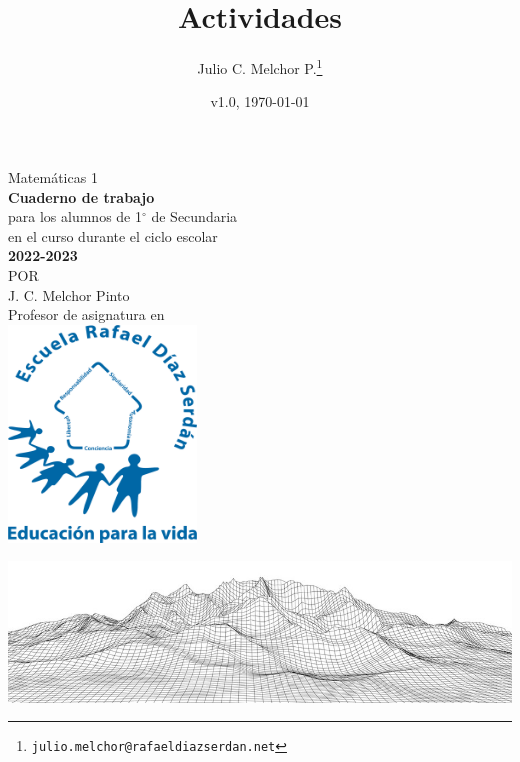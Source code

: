 \documentclass[]{book}
\title{Actividades}
\author{Julio C. Melchor P.\thanks{{\tt julio.melchor@rafaeldiazserdan.net}}}
\date{v1.0, \today}
\begin{document}
\pagestyle{empty}
\begin{center}
    {\Huge Matem\'aticas 1}\\
    \vspace{1cm}
    \normalsize
    \textbf{\large Cuaderno de trabajo}\\
    para los alumnos de 1$^\circ$ de  Secundaria\\
    en el curso durante el ciclo escolar\\
    \textbf{2022-2023}\\
    \vspace{2.2cm}
    \small POR\\
    \Large J. C. Melchor Pinto\\[0.5em]
    \normalsize Profesor de asignatura en\\
    \vspace{1cm}
    \includegraphics[width=5cm]{./Unidad 2/Images/LOGO_RDS_nobg}
\end{center}
\vspace{2.5cm}
%
\hspace{-16mm}
\includegraphics[width=\paperwidth]{./Unidad 2/Images/cover_bg_short}
\end{document}
